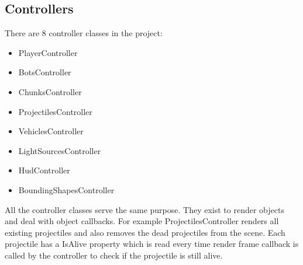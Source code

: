 \subsection{Controllers}

There are 8 controller classes in the project:

\begin{itemize}
    \item PlayerController
    \item BotsController
    \item ChunksController
    \item ProjectilesController
    \item VehiclesController
    \item LightSourcesController
    \item HudController
    \item BoundingShapesController
\end{itemize}

All the controller classes serve the same purpose.
They exist to render objects and deal with object callbacks.
For example ProjectilesController renders all existing projectiles and also removes the dead projectiles from the scene.
Each projectile has a IsAlive property which is read every time render frame callback is called by the controller to check if the projectile is still alive.
